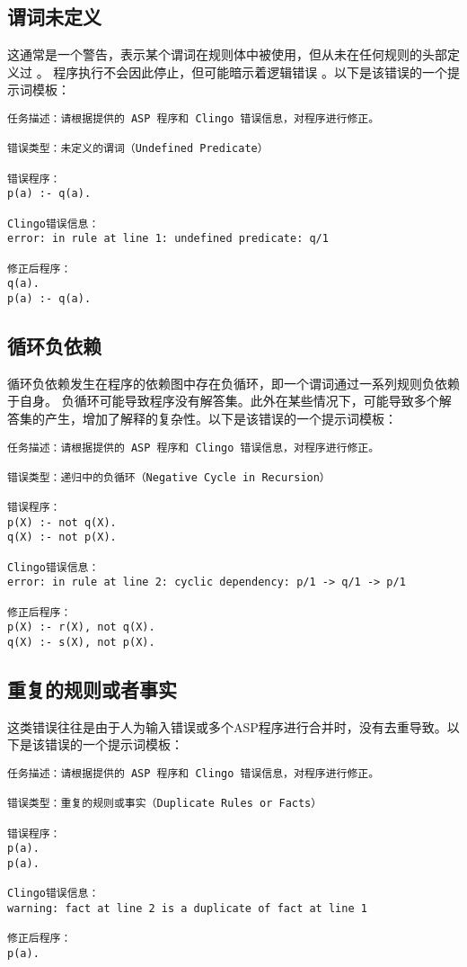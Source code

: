 \subsection{谓词未定义}
这通常是一个警告，表示某个谓词在规则体中被使用，但从未在任何规则的头部定义过 。
程序执行不会因此停止，但可能暗示着逻辑错误 。以下是该错误的一个提示词模板：
\begin{lstlisting}
任务描述：请根据提供的 ASP 程序和 Clingo 错误信息，对程序进行修正。

错误类型：未定义的谓词（Undefined Predicate）

错误程序：
p(a) :- q(a).

Clingo错误信息：
error: in rule at line 1: undefined predicate: q/1

修正后程序：
q(a).
p(a) :- q(a).
\end{lstlisting}
\subsection{循环负依赖}
循环负依赖发生在程序的依赖图中存在负循环，即一个谓词通过一系列规则负依赖于自身。
负循环可能导致程序没有解答集。​此外在某些情况下，可能导致多个解答集的产生，增加了解释的复杂性。以下是该错误的一个提示词模板：
\begin{lstlisting}
任务描述：请根据提供的 ASP 程序和 Clingo 错误信息，对程序进行修正。

错误类型：​递归中的负循环（Negative Cycle in Recursion）​

错误程序：
p(X) :- not q(X).
q(X) :- not p(X).

Clingo错误信息：
error: in rule at line 2: cyclic dependency: p/1 -> q/1 -> p/1

修正后程序：
p(X) :- r(X), not q(X).
q(X) :- s(X), not p(X).
\end{lstlisting}
\subsection{重复的规则或者事实}
这类错误往往是由于人为输入错误或多个ASP程序进行合并时，没有去重导致。以下是该错误的一个提示词模板：
\begin{lstlisting}
任务描述：请根据提供的 ASP 程序和 Clingo 错误信息，对程序进行修正。

错误类型：​重复的规则或事实（Duplicate Rules or Facts）​

错误程序：
p(a).
p(a).

Clingo错误信息：
warning: fact at line 2 is a duplicate of fact at line 1

修正后程序：
p(a).
\end{lstlisting}
